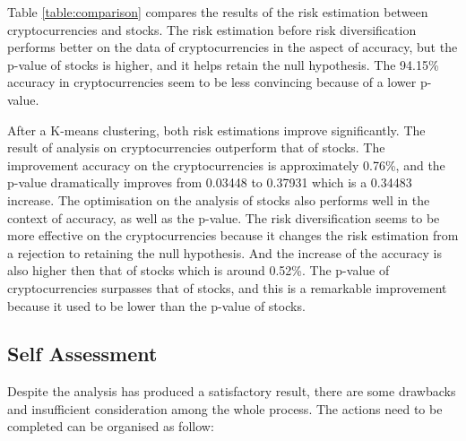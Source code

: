 \documentclass[11pt]{article} %
\theoremstyle{plain}
\theoremstyle{definition}
\begin{document}
Table \ref{table:comparison} compares the results of the risk estimation between cryptocurrencies and stocks. The risk estimation before risk diversification performs better on the data of cryptocurrencies in the aspect of accuracy, but the p-value of stocks is higher, and it helps retain the null hypothesis. The 94.15\% accuracy in cryptocurrencies seem to be less convincing because of a lower p-value.

After a K-means clustering, both risk estimations improve significantly. The result of analysis on cryptocurrencies outperform that of stocks. The improvement accuracy on the cryptocurrencies is approximately 0.76\%, and the p-value dramatically improves from 0.03448 to 0.37931 which is a 0.34483 increase. The optimisation on the analysis of stocks also performs well in the context of accuracy, as well as the p-value. The risk diversification seems to be more effective on the cryptocurrencies because it changes the risk estimation from a rejection to retaining the null hypothesis. And the increase of the accuracy is also higher then that of stocks which is around 0.52\%. The p-value of cryptocurrencies surpasses that of stocks, and this is a remarkable improvement because it used to be lower than the p-value of stocks.

\subsection{Self Assessment}

Despite the analysis has produced a satisfactory result, there are some drawbacks and insufficient consideration among the whole process. The actions need to be completed can be organised as follow:
\end{document}
